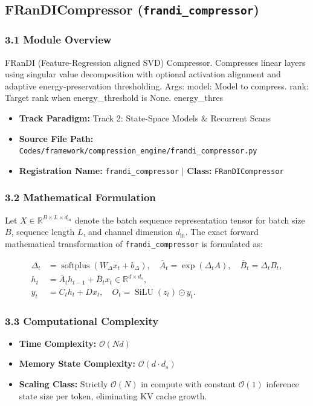 \subsection{FRanDICompressor (\texttt{frandi\_compressor})}
\label{sec:app_module_frandi\_compressor}

\subsubsection*{3.1 Module Overview}
FRanDI (Feature-Regression aligned SVD) Compressor. Compresses linear layers using singular value decomposition with optional activation alignment and adaptive energy-preservation thresholding.  Args:     model: Model to compress.     rank: Target rank when energy\_threshold is None.     energy\_thres
\begin{itemize}
    \item \textbf{Track Paradigm:} Track 2: State-Space Models & Recurrent Scans
    \item \textbf{Source File Path:} \texttt{Codes/framework/compression\_engine/frandi\_compressor.py}
    \item \textbf{Registration Name:} \texttt{frandi\_compressor} $\mid$ \textbf{Class:} \texttt{FRanDICompressor}
\end{itemize}

\subsubsection*{3.2 Mathematical Formulation}
Let $X \in \mathbb{R}^{B \times L \times d_{\text{in}}}$ denote the batch sequence representation tensor for batch size $B$, sequence length $L$, and channel dimension $d_{\text{in}}$. The exact forward mathematical transformation of \texttt{frandi\_compressor} is formulated as:

\begin{align}
\Delta_t &= \operatorname{softplus}(W_\Delta x_t + b_\Delta), \quad \bar{A}_t = \exp(\Delta_t A), \quad \bar{B}_t = \Delta_t B_t, \\
h_t &= \bar{A}_t h_{t-1} + \bar{B}_t x_t \in \mathbb{R}^{d \times d_s}, \\
y_t &= C_t h_t + D x_t, \quad O_t = \operatorname{SiLU}(z_t) \odot y_t.
\end{align}


\subsubsection*{3.3 Computational Complexity}
\begin{itemize}
    \item \textbf{Time Complexity:} $\mathcal{O}(N d)$
    \item \textbf{Memory State Complexity:} $\mathcal{O}(d \cdot d_s)$
    \item \textbf{Scaling Class:} Strictly $\mathcal{O}(N)$ in compute with constant $\mathcal{O}(1)$ inference state size per token, eliminating KV cache growth.
\end{itemize}

